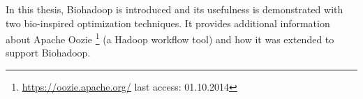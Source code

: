 In this thesis, Biohadoop is introduced and its usefulness is demonstrated with two bio-inspired optimization techniques. It provides additional information about Apache Oozie \footnote{\url{https://oozie.apache.org/} last access: 01.10.2014} (a Hadoop workflow tool) and how it was extended to support Biohadoop.

% 
% 
% 
% 
